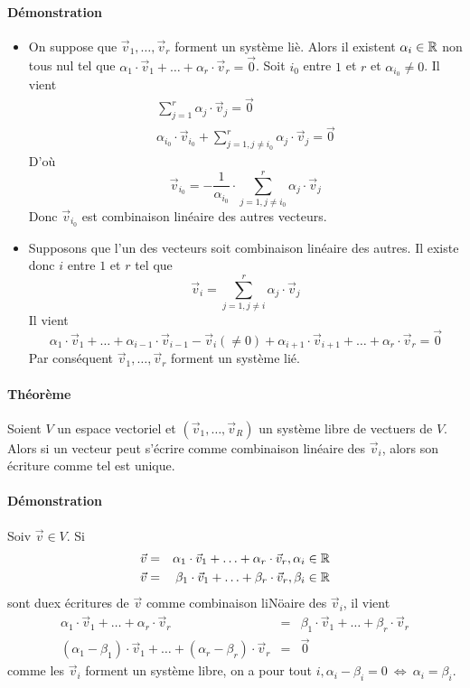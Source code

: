 \paragraph{Démonstration} 
\begin{itemize}
  \item On suppose que $\vec{v}_1, \ldots, \vec{v}_r$ forment un système liè. Alors il existent $\alpha_i \in \mathbb{R}$ non tous nul tel que $\alpha_1 \cdot \vec{v}_1 + \ldots + \alpha_r \cdot \vec{v}_r = \vec{0}$. Soit $i_0$ entre $1$ et $r$ et $\alpha_{i_0} \neq 0$. Il vient
    \begin{eqnarray*}
      \sum_{j=1}^{r} \alpha_j \cdot \vec{v}_j = \vec{0} \\
      \alpha_{i_0} \cdot \vec{v}_{i_0} + \sum_{j=1, j \neq i_0}^{r} \alpha_j \cdot \vec{v}_j = \vec{0}
    \end{eqnarray*}
    D'où
    $$\vec{v}_{i_0} = -\frac{1}{\alpha_{i_0}} \cdot \sum_{j=1, j \neq i_0}^{r} \alpha_j \cdot \vec{v}_j$$
    Donc $\vec{v}_{i_0}$ est combinaison linéaire des autres vecteurs.
  
  \item Supposons que l'un des vecteurs soit combinaison linéaire des autres. Il existe donc $i$ entre $1$ et $r$ tel que 
    $$\vec{v}_i = \sum_{j=1, j \neq i}^{r} \alpha_j \cdot \vec{v}_j$$
    Il vient 
    $$\alpha_1 \cdot \vec{v}_1 + \ldots + \alpha_{i-1} \cdot \vec{v}_{i-1} - \vec{v}_i (\neq 0) + \alpha_{i+1} \cdot \vec{v}_{i+1} + \ldots + \alpha_r \cdot \vec{v}_r = \vec{0}$$
    Par conséquent $\vec{v}_1, \ldots, \vec{v}_r$ forment un système lié.
\end{itemize}

\paragraph*{Théorème} Soient $V$ un espace vectoriel et $(\vec{v}_1, \ldots, \vec{v}_R)$ un système libre de vectuers de $V$. Alors si un vecteur peut s'écrire comme combinaison linéaire des $\vec{v}_i$, alors son écriture comme tel est unique.

\paragraph{Démonstration} Soiv $\vec{v} \in V$. Si 
\begin{eqnarray*}
  \vec{v} &=& \alpha_1 \cdot \vec{v}_1 + \ldots + \alpha_r \cdot \vec{v}_r, \alpha_i \in \mathbb{R} \\
  \vec{v} &=& \beta_1 \cdot \vec{v}_1 + \ldots + \beta_r \cdot \vec{v}_r, \beta_i \in \mathbb{R} 
\end{eqnarray*}
sont duex écritures de $\vec{v}$ comme combinaison liNöaire des $\vec{v}_i$, il vient
\begin{eqnarray*}
  \alpha_1 \cdot \vec{v}_1 + \ldots + \alpha_r \cdot \vec{v}_r &=& \beta_1 \cdot \vec{v}_1 + \ldots + \beta_r \cdot \vec{v}_r \\
  (\alpha_1 - \beta_1) \cdot \vec{v}_1 + \ldots + (\alpha_r - \beta_r) \cdot \vec{v}_r &=& \vec{0}
\end{eqnarray*}
comme les $\vec{v}_i$ forment un système libre, on a pour tout $i, \alpha_i - \beta_i = 0 ~\Leftrightarrow~ \alpha_i = \beta_i$.

